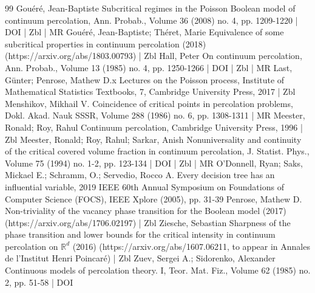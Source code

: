 \documentclass[10pt]{amsart}
\theoremstyle{definition}\newtheorem{defi}[theo]{Definition}\newtheorem{rema}[theo]{Remark}\newtheorem{exam}[theo]{Example}\newtheorem{exem}[theo]{Example}\newtheorem{nota}[theo]{Notation}
\begin{document}
\begin{thebibliography}{99}
Gouéré, Jean-Baptiste Subcritical regimes in the Poisson Boolean model of continuum percolation, Ann. Probab., Volume 36 (2008) no. 4, pp. 1209-1220 | DOI | Zbl | MR
Gouéré, Jean-Baptiste; Théret, Marie Equivalence of some subcritical properties in continuum percolation (2018) (https://arxiv.org/abs/1803.00793) | Zbl
Hall, Peter On continuum percolation, Ann. Probab., Volume 13 (1985) no. 4, pp. 1250-1266 | DOI | Zbl | MR
Last, Günter; Penrose, Mathew D.x Lectures on the Poisson process, Institute of Mathematical Statistics Textbooks, 7, Cambridge University Press, 2017 | Zbl
Menshikov, Mikhail V. Coincidence of critical points in percolation problems, Dokl. Akad. Nauk SSSR, Volume 288 (1986) no. 6, pp. 1308-1311 | MR
Meester, Ronald; Roy, Rahul Continuum percolation, Cambridge University Press, 1996 | Zbl
Meester, Ronald; Roy, Rahul; Sarkar, Anish Nonuniversality and continuity of the critical covered volume fraction in continuum percolation, J. Statist. Phys., Volume 75 (1994) no. 1-2, pp. 123-134 | DOI | Zbl | MR
O’Donnell, Ryan; Saks, Mickael E.; Schramm, O.; Servedio, Rocco A. Every decision tree has an influential variable, 2019 IEEE 60th Annual Symposium on Foundations of Computer Science (FOCS), IEEE Xplore (2005), pp. 31-39
Penrose, Mathew D. Non-triviality of the vacancy phase transition for the Boolean model (2017) (https://arxiv.org/abs/1706.02197) | Zbl
Ziesche, Sebastian Sharpness of the phase transition and lower bounds for the critical intensity in continuum percolation on $\mathbb{R}^d$ (2016) (https://arxiv.org/abs/1607.06211, to appear in Annales de l’Institut Henri Poincaré) | Zbl
Zuev, Sergei A.; Sidorenko, Alexander Continuous models of percolation theory. I, Teor. Mat. Fiz., Volume 62 (1985) no. 2, pp. 51-58 | DOI
\end{thebibliography}
\end{document}

